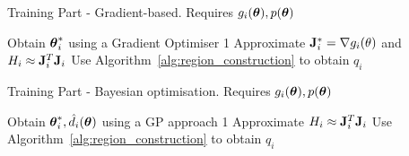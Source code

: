 \begin{minipage}{0.46\textwidth}
\begin{algorithm}[H]
    \centering
    \caption{Training Part - Gradient-based. Requires $g_i(\boldsymbol{\theta}), p(\boldsymbol{\theta})$}\label{alg:training_GB}
    \begin{algorithmic}[1]
        \State Obtain $\boldsymbol{\theta}_i^*$ using a Gradient Optimiser
         1
        \Else
        \State Approximate $\mathbf{J}_i^* = \nabla g_i(\theta)$ and $H_i \approx \mathbf{J}^T_i\mathbf{J}_i$
        \State Use Algorithm~\ref{alg:region_construction} to obtain $q_i$
        \EndIf      
      \EndFor
    \end{algorithmic}
\end{algorithm}
\end{minipage}
\hfill
\begin{minipage}{0.46\textwidth}
\begin{algorithm}[H]
    \centering
    \caption{Training Part - Bayesian optimisation. Requires $g_i(\boldsymbol{\theta}), p(\boldsymbol{\theta})$}\label{alg:training_GP}
    \begin{algorithmic}[1]
        \State Obtain $\boldsymbol{\theta}_i^*, \hat{d}_i(\boldsymbol{\theta})$ using a GP approach
         1
        \Else
        \State Approximate $H_i \approx \mathbf{J}^T_i \mathbf{J}_i$
        \State Use Algorithm~\ref{alg:region_construction} to obtain $q_i$
        \EndIf      
      \EndFor
    \end{algorithmic}
\end{algorithm}
\end{minipage}


